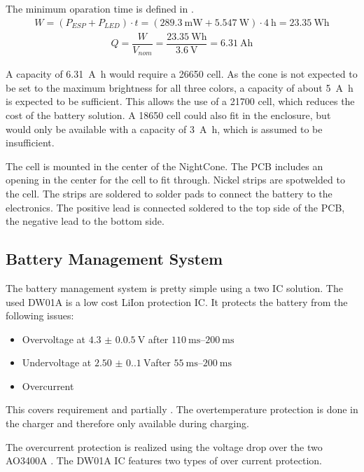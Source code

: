 The minimum oparation time is defined in . 
\begin{align}
    W = \left(P_{ESP} + P_{LED}\right) \cdot t = \left(\qty{289.3}{\milli\watt} + \qty{5.547}{\watt}\right) \cdot \qty{4}{\hour} = \qty{23.35}{\watt\hour}
\end{align}
\begin{align}
    Q = \dfrac{W}{V_{nom}} = \dfrac{\qty{23.35}{\watt\hour}}{\qty{3.6}{\volt}} = \qty{6.31}{\ampere\hour}
\end{align}

A capacity of \qty{6.31}{\ampere\hour} would require a 26650 cell. As the cone is not expected to be set to the maximum brightness for all three colors, a capacity of about \qty{5}{\ampere\hour} is expected to be sufficient. This allows the use of a 21700 cell, which reduces the cost of the battery solution. A 18650 cell could also fit in the enclosure, but would only be available with a capacity of \qty{3}{\ampere\hour}, which is assumed to be insufficient. 

The cell is mounted in the center of the NightCone. The \ac{PCB} includes an opening in the center for the cell to fit through. Nickel strips are spotwelded to the cell. The strips are soldered to solder pads to connect the battery to the electronics. The positive lead is connected soldered to the top side of the \ac{PCB}, the negative lead to the bottom side. 

\subsection{Battery Management System}
\label{sec_bms}
The battery management system is pretty simple using a two IC solution. The used DW01A \cite{Puolop:DW01A} is a low cost \ac{LiIon} protection IC. It protects the battery from the following issues: 
\begin{itemize}
	\item Overvoltage at $\qty{4.3(0.05)}{\V}$  after $\qtyrange{110}{200}{\ms}$
	\item Undervoltage at $\qty{2.50(0.10)}{\V}$after $\qtyrange{55}{200}{\ms}$
	\item Overcurrent
\end{itemize}
This covers requirement  and partially . The overtemperature protection is done in the charger and therefore only available during charging. 

The overcurrent protection is realized using the voltage drop over the two AO3400A \cite{AOSMD:AO3400A}. The DW01A IC features two types of over current protection. 


